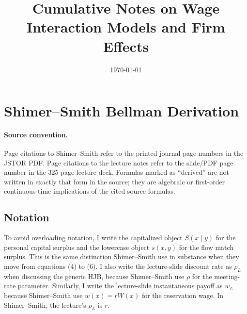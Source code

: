\documentclass[11pt]{article}
\title{Cumulative Notes on Wage Interaction Models and Firm Effects}
\author{}
\date{\today}
\begin{document}
\maketitle

\section{Shimer--Smith Bellman Derivation}

\paragraph{Source convention.}
Page citations to Shimer--Smith refer to the printed journal page numbers in
the JSTOR PDF. Page citations to the lecture notes refer to the slide/PDF page
number in the 325-page lecture deck. Formulas marked as ``derived'' are not
written in exactly that form in the source; they are algebraic or first-order
continuous-time implications of the cited source formulas.

\subsection{Notation}

To avoid overloading notation, I write the capitalized object $S(x\mid y)$ for
the personal capital surplus and the lowercase object $s(x,y)$ for the flow match
surplus. This is the same distinction Shimer--Smith use in substance when they
move from equations (4) to (6). I also write the lecture-slide discount rate as
$\rho_L$ when discussing the generic HJB, because Shimer--Smith use $\rho$ for
the meeting-rate parameter. Similarly, I write the lecture-slide instantaneous
payoff as $w_L$ because Shimer--Smith use $w(x)=rW(x)$ for the reservation
wage. In Shimer--Smith, the lecture's $\rho_L$ is $r$.
\end{document}
